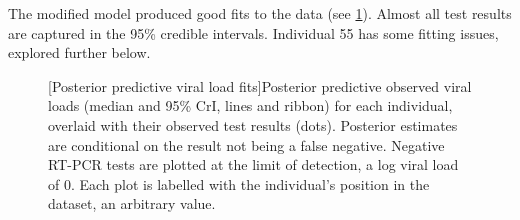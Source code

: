 \documentclass[thesis.tex]{subfiles}
\begin{document}
The modified model produced good fits to the data (see \cref{ATACCC:fig:goodness-of-fits}).
Almost all test results are captured in the 95\% credible intervals.
Individual 55 has some fitting issues, explored further below.
\begin{figure}
  \vspace{-3cm}
  \captionsetup{width=0.8\paperwidth}
  [Posterior predictive viral load fits]{Posterior predictive observed viral loads (median and 95\% CrI, lines and ribbon) for each individual, overlaid with their observed test results (dots). Posterior estimates are conditional on the result not being a false negative. Negative RT-PCR tests are plotted at the limit of detection, \ie a log viral load of 0. Each plot is labelled with the individual's position in the dataset, an arbitrary value. \label{ATACCC:fig:goodness-of-fits}}
\end{figure}
\end{document}
